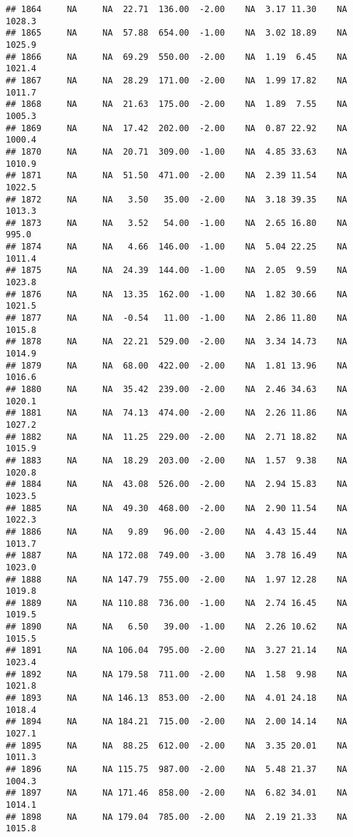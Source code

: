 \documentclass{article}\usepackage{graphicx, color}
\makeatletter
\newenvironment{kframe}{%
 \def\at@end@of@kframe{}%
 \ifinner\ifhmode%
  \def\at@end@of@kframe{\end{minipage}}%
  \begin{minipage}{\columnwidth}%
 \fi\fi%
 \def\FrameCommand##1{\hskip\@totalleftmargin \hskip-\fboxsep
 \colorbox{shadecolor}{##1}\hskip-\fboxsep
     \hskip-\linewidth \hskip-\@totalleftmargin \hskip\columnwidth}%
 \MakeFramed {\advance\hsize-\width
   \@totalleftmargin\z@ \linewidth\hsize
   \@setminipage}}%
 {\par\unskip\endMakeFramed%
 \at@end@of@kframe}
\newenvironment{knitrout}{}{} %
\makeatother
\begin{document}
\begin{knitrout}
\begin{kframe}
\begin{verbatim}
## 1864     NA     NA  22.71  136.00  -2.00    NA  3.17 11.30    NA 1028.3
## 1865     NA     NA  57.88  654.00  -1.00    NA  3.02 18.89    NA 1025.9
## 1866     NA     NA  69.29  550.00  -2.00    NA  1.19  6.45    NA 1021.4
## 1867     NA     NA  28.29  171.00  -2.00    NA  1.99 17.82    NA 1011.7
## 1868     NA     NA  21.63  175.00  -2.00    NA  1.89  7.55    NA 1005.3
## 1869     NA     NA  17.42  202.00  -2.00    NA  0.87 22.92    NA 1000.4
## 1870     NA     NA  20.71  309.00  -1.00    NA  4.85 33.63    NA 1010.9
## 1871     NA     NA  51.50  471.00  -2.00    NA  2.39 11.54    NA 1022.5
## 1872     NA     NA   3.50   35.00  -2.00    NA  3.18 39.35    NA 1013.3
## 1873     NA     NA   3.52   54.00  -1.00    NA  2.65 16.80    NA  995.0
## 1874     NA     NA   4.66  146.00  -1.00    NA  5.04 22.25    NA 1011.4
## 1875     NA     NA  24.39  144.00  -1.00    NA  2.05  9.59    NA 1023.8
## 1876     NA     NA  13.35  162.00  -1.00    NA  1.82 30.66    NA 1021.5
## 1877     NA     NA  -0.54   11.00  -1.00    NA  2.86 11.80    NA 1015.8
## 1878     NA     NA  22.21  529.00  -2.00    NA  3.34 14.73    NA 1014.9
## 1879     NA     NA  68.00  422.00  -2.00    NA  1.81 13.96    NA 1016.6
## 1880     NA     NA  35.42  239.00  -2.00    NA  2.46 34.63    NA 1020.1
## 1881     NA     NA  74.13  474.00  -2.00    NA  2.26 11.86    NA 1027.2
## 1882     NA     NA  11.25  229.00  -2.00    NA  2.71 18.82    NA 1015.9
## 1883     NA     NA  18.29  203.00  -2.00    NA  1.57  9.38    NA 1020.8
## 1884     NA     NA  43.08  526.00  -2.00    NA  2.94 15.83    NA 1023.5
## 1885     NA     NA  49.30  468.00  -2.00    NA  2.90 11.54    NA 1022.3
## 1886     NA     NA   9.89   96.00  -2.00    NA  4.43 15.44    NA 1013.7
## 1887     NA     NA 172.08  749.00  -3.00    NA  3.78 16.49    NA 1023.0
## 1888     NA     NA 147.79  755.00  -2.00    NA  1.97 12.28    NA 1019.8
## 1889     NA     NA 110.88  736.00  -1.00    NA  2.74 16.45    NA 1019.5
## 1890     NA     NA   6.50   39.00  -1.00    NA  2.26 10.62    NA 1015.5
## 1891     NA     NA 106.04  795.00  -2.00    NA  3.27 21.14    NA 1023.4
## 1892     NA     NA 179.58  711.00  -2.00    NA  1.58  9.98    NA 1021.8
## 1893     NA     NA 146.13  853.00  -2.00    NA  4.01 24.18    NA 1018.4
## 1894     NA     NA 184.21  715.00  -2.00    NA  2.00 14.14    NA 1027.1
## 1895     NA     NA  88.25  612.00  -2.00    NA  3.35 20.01    NA 1011.3
## 1896     NA     NA 115.75  987.00  -2.00    NA  5.48 21.37    NA 1004.3
## 1897     NA     NA 171.46  858.00  -2.00    NA  6.82 34.01    NA 1014.1
## 1898     NA     NA 179.04  785.00  -2.00    NA  2.19 21.33    NA 1015.8

\end{verbatim}
\end{kframe}
\end{knitrout}
\end{document}
